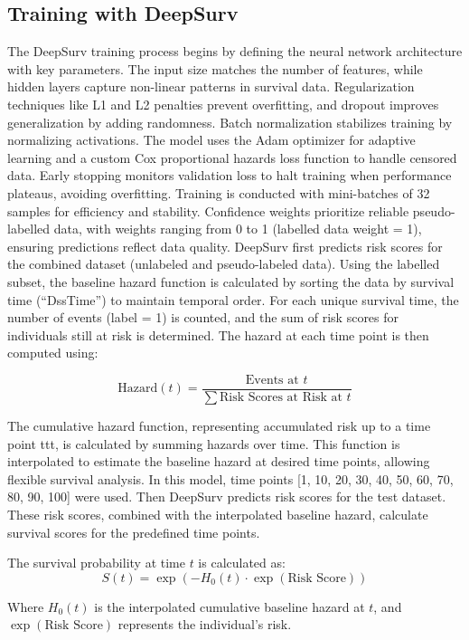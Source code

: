 \documentclass[conference]{ieeeconf}
\begin{document}
\subsection{Training with DeepSurv}
The DeepSurv training process begins by defining the neural network architecture with key parameters. The input size matches the number of features, while hidden layers capture non-linear patterns in survival data. Regularization techniques like L1 and L2 penalties prevent overfitting, and dropout improves generalization by adding randomness. Batch normalization stabilizes training by normalizing activations.
The model uses the Adam optimizer for adaptive learning and a custom Cox proportional hazards loss function to handle censored data. Early stopping monitors validation loss to halt training when performance plateaus, avoiding overfitting. Training is conducted with mini-batches of 32 samples for efficiency and stability. Confidence weights prioritize reliable pseudo-labelled data, with weights ranging from 0 to 1 (labelled data weight = 1), ensuring predictions reflect data quality. 
DeepSurv first predicts risk scores for the combined dataset (unlabeled and pseudo-labeled data). Using the labelled subset, the baseline hazard function is calculated by sorting the data by survival time (“DssTime”) to maintain temporal order. For each unique survival time, the number of events (label = 1) is counted, and the sum of risk scores for individuals still at risk is determined. The hazard at each time point is then computed using:  

$$
\text{Hazard}(t) = \frac{\text{Events at } t}{\sum \text{Risk Scores at Risk at } t}
$$

The cumulative hazard function, representing accumulated risk up to a time point ttt, is calculated by summing hazards over time. This function is interpolated to estimate the baseline hazard at desired time points, allowing flexible survival analysis. In this model, time points [1, 10, 20, 30, 40, 50, 60, 70, 80, 90, 100] were used. 
Then DeepSurv predicts risk scores for the test dataset. These risk scores, combined with the interpolated baseline hazard, calculate survival scores for the predefined time points. 

The survival probability at time $t$ is calculated as:
$$
S(t) = \exp \left( -H_0(t) \cdot \exp(\text{Risk Score}) \right) 
$$

Where $H_0(t)$ is the interpolated cumulative baseline hazard at $t$, and
$\exp(\text{Risk Score})$ represents the individual's risk.
\end{document}
